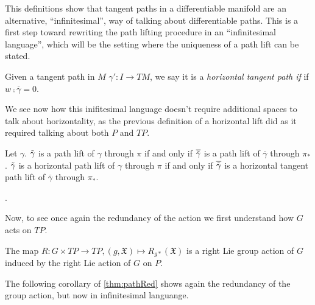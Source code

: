 This definitions show that tangent paths in a differentiable manifold are an alternative, ``infinitesimal'', way of talking about differentiable paths. This is a first step toward rewriting the path lifting procedure in an ``infinitesimal language'', which will be the setting where the uniqueness of a path lift can be stated. 

\begin{definition}
Given a tangent path in $M$  $\gamma': I \to TM$, we say it is a \emph{horizontal tangent path if} if $w \comp \overline{\gamma} = 0$.
\end{definition}

We see now how this inifitesimal language doesn't require additional spaces to talk about horizontality, as the previous definition of a horizontal lift did as it required talking about both $P$ and $TP$.

\begin{theorem}
Let $\gamma$. $\Tilde{\gamma}$ is a path lift of $\gamma$ through $\pi$ if and only if $\overline{\Tilde{\gamma}}$ is a path lift of $\overline{\gamma}$ through $\pi_*$. $\Tilde{\gamma}$ is a horizontal path lift of $\gamma$ through $\pi$ if and only if $\overline{\Tilde{\gamma}}$ is a horizontal tangent path lift of $\overline{\gamma}$ through $\pi_*$.
\end{theorem}

. 

Now, to see once again the redundancy of the action we first understand how $G$ acts on $TP$.

\begin{proposition}
The map $R : G \times TP \to TP, (g, \mathfrak{X}) \mapsto R_{g*}(\mathfrak X)$ is a right Lie group action of $G$ induced by the right Lie action of $G$ on $P$.
\end{proposition}

The following corollary of \ref{thm:pathRed} shows again the redundancy of the group action, but now in infinitesimal languange.

